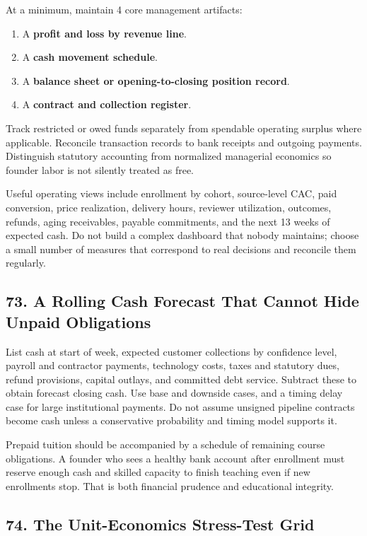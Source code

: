 At a minimum, maintain 4 core management artifacts:
\begin{enumerate}
  \item A \textbf{profit and loss by revenue line}.
  \item A \textbf{cash movement schedule}.
  \item A \textbf{balance sheet or opening-to-closing position record}.
  \item A \textbf{contract and collection register}.
\end{enumerate}
Track restricted or owed funds separately from spendable operating surplus where applicable. Reconcile transaction records to bank receipts and outgoing payments. Distinguish statutory accounting from normalized managerial economics so founder labor is not silently treated as free.

Useful operating views include enrollment by cohort, source-level CAC, paid conversion, price realization, delivery hours, reviewer utilization, outcomes, refunds, aging receivables, payable commitments, and the next 13 weeks of expected cash. Do not build a complex dashboard that nobody maintains; choose a small number of measures that correspond to real decisions and reconcile them regularly.

\subsection*{73. A Rolling Cash Forecast That Cannot Hide Unpaid Obligations}

List cash at start of week, expected customer collections by confidence level, payroll and contractor payments, technology costs, taxes and statutory dues, refund provisions, capital outlays, and committed debt service. Subtract these to obtain forecast closing cash. Use base and downside cases, and a timing delay case for large institutional payments. Do not assume unsigned pipeline contracts become cash unless a conservative probability and timing model supports it.

Prepaid tuition should be accompanied by a schedule of remaining course obligations. A founder who sees a healthy bank account after enrollment must reserve enough cash and skilled capacity to finish teaching even if new enrollments stop. That is both financial prudence and educational integrity.

\subsection*{74. The Unit-Economics Stress-Test Grid}

